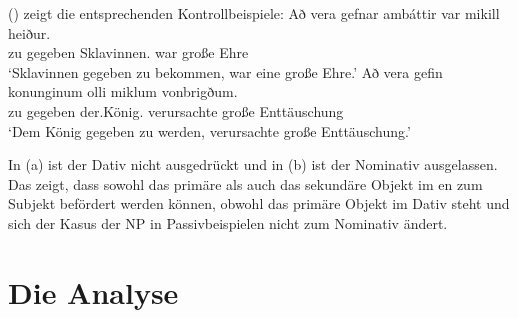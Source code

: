 \noindent
() zeigt die entsprechenden Kontrollbeispiele:
\eal
\ex
\gll Að vera gefnar ambáttir var mikill heiður.\\
     zu \AUX{} gegeben Sklavinnen.\NOM{} war große Ehre\\\icelandic
\glt `Sklavinnen gegeben zu bekommen, war eine große Ehre.'
\ex
\gll Að vera gefin konunginum olli miklum vonbrigðum.\\
     zu \AUX{} gegeben der.König.\DAT{} verursachte große Enttäuschung\\
\glt `Dem König gegeben zu werden, verursachte große Enttäuschung.'

\zl
In (a) ist der Dativ nicht ausgedrückt und in (b) ist der Nominativ ausgelassen. Das zeigt,
dass sowohl das primäre als auch das sekundäre Objekt im en zum Subjekt befördert werden können, obwohl
das primäre Objekt im Dativ steht und sich der Kasus der NP in Passivbeispielen nicht zum Nominativ ändert.








\section{Die Analyse}

